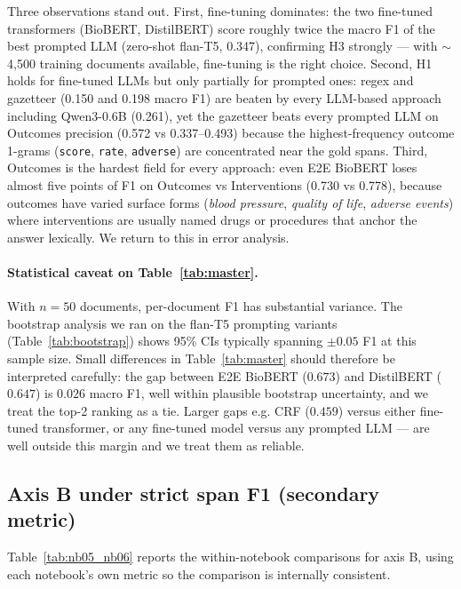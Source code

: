 \documentclass[11pt]{article}
\begin{document}
Three observations stand out. First, fine-tuning dominates: the two
fine-tuned transformers (BioBERT, DistilBERT) score roughly twice the
macro F1 of the best prompted LLM (zero-shot flan-T5, 0.347), confirming
H3 strongly --- with $\sim$4{,}500 training documents available,
fine-tuning is the right choice. Second, H1 holds for fine-tuned LLMs
but only partially for prompted ones: regex and gazetteer (0.150 and
0.198 macro F1) are beaten by every LLM-based approach including
Qwen3-0.6B (0.261), yet the gazetteer beats every prompted LLM on
Outcomes precision (0.572 vs 0.337--0.493) because the
highest-frequency outcome 1-grams (\texttt{score}, \texttt{rate},
\texttt{adverse}) are concentrated near the gold spans. Third, Outcomes
is the hardest field for every approach: even E2E BioBERT loses almost
five points of F1 on Outcomes vs Interventions (0.730 vs 0.778), because
outcomes have varied surface forms (\textit{blood pressure},
\textit{quality of life}, \textit{adverse events}) where interventions
are usually named drugs or procedures that anchor the answer
lexically. We return to this in error analysis.
\paragraph{Statistical caveat on Table~\ref{tab:master}.} With $n\!=\!50$
documents, per-document F1 has substantial variance. The bootstrap
analysis we ran on the flan-T5 prompting variants
(Table~\ref{tab:bootstrap}) shows 95\% CIs typically spanning $\pm 0.05$
F1 at this sample size. Small differences in Table~\ref{tab:master}
should therefore be interpreted carefully: the gap between E2E BioBERT
($0.673$) and DistilBERT ($0.647$) is $0.026$ macro F1, well within
plausible bootstrap uncertainty, and we treat the top-2 ranking as a
tie. Larger gaps e.g. CRF ($0.459$) versus either fine-tuned
transformer, or any fine-tuned model versus any prompted LLM --- are
well outside this margin and we treat them as reliable.

\subsection{Axis B under strict span F1 (secondary metric)}
\label{sec:e2e_vs_dec}

Table~\ref{tab:nb05_nb06} reports the within-notebook comparisons for
axis B, using each notebook's own metric so the comparison is internally
consistent.
\end{document}
